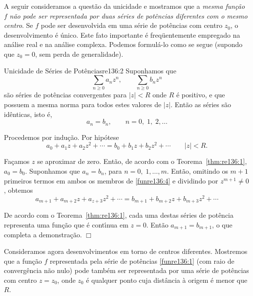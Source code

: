 A seguir consideramos a quest\~{a}o da unicidade e mostramos que a
\textit{mesma fun\c{c}\~{a}o} $f$ \textit{n\~{a}o pode ser representada por
duas s\'{e}ries de pot\^{e}ncias diferentes com o mesmo centro}. Se $f$
pode ser desenvolvida em uma s\'{e}rie de pot\^{e}ncias com centro $z_{0}$,
o desenvolvimento \'{e} \'{u}nico. Este fato importante \'{e} freq\"{u}entemente
empregado na an\'{a}lise real e na an\'{a}lise complexa. Podemos
formul\'{a}-lo como se segue (supondo que $z_{0} = 0$, sem perda de
generalidade).


\begin{theoc}{Unicidade de S\'{e}ries de Pot\^{e}ncias}{re136:2} 
Suponhamos que
\begin{equation*}
\sum_{n\geq 0}a_nz^n,\qquad \sum_{n\geq 0}b_nz^n
\end{equation*}
s\~{a}o s\'{e}ries de pot\^{e}ncias convergentes para $|z|<R$ onde $R$ \'{e}
positivo, e que possuem a mesma norma para todos estes valores de
$|z|$. Ent\~{a}o as s\'{e}ries s\~{a}o id\^{e}nticas, isto \'{e},
\begin{equation}\label{funre136:3}
a_n=b_n,\qquad n = 0,\; 1,\; 2,\ldots
\end{equation}
\end{theoc}

\prova Procedemos por indu\c{c}\~{a}o. Por hip\'{o}tese
\begin{equation}\label{funre136:4}
a_{0} + a_1z + a_2z^2+\cdots = b_{0} + b_1z + b_2z^2+\cdots\qquad |z|< R.
\end{equation}

Fa\c{c}amos $z$ se aproximar de zero. Ent\~{a}o, de acordo com o
Teorema~\ref{thm:re136:1}, $a_{0} = b_{0}$. Suponhamos que $a_n = b_n$,
para $n = 0,\; 1,\ldots, m$. Ent\~{a}o, omitindo os $m + 1$ primeiros
termos em ambos os membros de \eqref{funre136:4} e dividindo por
$z^{m+1}\neq 0$, obtemos
\begin{equation*}
a_{m+1} + a_{m+2}z + a_{z+3}z^2 +\cdots= b_{m+1} + b_{m+2}z + b_{m+3}z^2 +\cdots
\end{equation*}

De acordo com o Teorema~\ref{thm:re136:1}, cada uma destas s\'{e}ries de
pot\^{e}ncia representa uma fun\c{c}\~{a}o que \'{e} cont\'{\i}nua em $z = 0$. Ent\~{a}o
$a_{m+1} = b_{m+1}$, o que completa a demonstra\c{c}\~{a}o. \hfill $\Box$

Consideramos agora desenvolvimentos  em torno de centros
diferentes. Mostremos que a fun\c{c}\~{a}o $f$ representada pela s\'{e}rie de
pot\^{e}ncias \eqref{funre136:1} (com raio de converg\^{e}ncia n\~{a}o nulo)
pode tamb\'{e}m ser representada por uma s\'{e}rie de pot\^{e}ncias com centro
$z = z_{0}$, onde $z_{0}$ \'{e} qualquer ponto cuja dist\^{a}ncia \`{a} origem \'{e}
menor que $R$.

